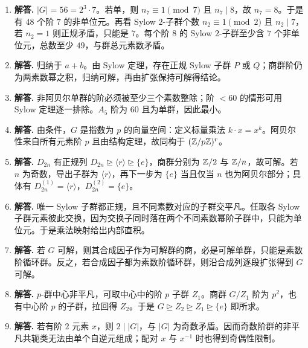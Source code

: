 \begin{enumerate}[label=\textbf{\arabic*.}, leftmargin=*, itemsep=1em]
\item \textbf{解答.} $|G|=56=2^3\cdot7$。若单，则 $n_7\equiv1\pmod7$ 且 $n_7\mid8$，故 $n_7=8$。于是有 $48$ 个阶 $7$ 的非单位元。再看 Sylow $2$-子群个数 $n_2\equiv1\pmod2$ 且 $n_2\mid7$，若 $n_2=1$ 则正规矛盾，只能是 $7$。每个阶 $8$ 的 Sylow $2$-子群至少含 $7$ 个非单位元，总数至少 $49$，与群总元素数矛盾。
\item \textbf{解答.} 归纳于 $a+b$。由 Sylow 定理，存在正规 Sylow 子群 $P$ 或 $Q$；商群阶仍为两素数幂之积，归纳可解，再由扩张保持可解得结论。
\item \textbf{解答.} 非阿贝尔单群的阶必须被至少三个素数整除；阶 $<60$ 的情形可用 Sylow 定理逐一排除。$A_5$ 阶为 $60$ 且为单群，因此最小。
\item \textbf{解答.} 由条件，$G$ 是指数为 $p$ 的向量空间：定义标量乘法 $k\cdot x=x^k$。阿贝尔性来自所有元素阶 $p$ 且由结构定理，故同构于 $(\mathbb{Z}/p\mathbb{Z})^r$。
\item \textbf{解答.} $D_{2n}$ 有正规列 $D_{2n}\trianglerighteq\langle r\rangle\trianglerighteq\{e\}$，商群分别为 $\mathbb{Z}/2$ 与 $\mathbb{Z}/n$，故可解。若 $n$ 为奇数，导出子群为 $\langle r\rangle$，再下一步为 $\{e\}$ 当且仅当 $n$ 也为阿贝尔部分；具体有 $D_{2n}^{(1)}=\langle r\rangle$，$D_{2n}^{(2)}=\{e\}$。
\item \textbf{解答.} 唯一 Sylow 子群都正规，且不同素数对应的子群交平凡。任取各 Sylow 子群元素彼此交换，因为交换子同时落在两个不同素数幂阶子群中，只能为单位元。于是乘法映射给出内部直积。
\item \textbf{解答.} 若 $G$ 可解，则其合成因子作为可解群的商，必是可解单群，只能是素数阶循环群。反之，若合成因子都为素数阶循环群，则沿合成列逐段扩张得到 $G$ 可解。
\item \textbf{解答.} $p$-群中心非平凡，可取中心中的阶 $p$ 子群 $Z_1$。商群 $G/Z_1$ 阶为 $p^2$，也有中心阶 $p$ 的子群，拉回得 $Z_2$。于是 $G\trianglerighteq Z_2\trianglerighteq Z_1\trianglerighteq\{e\}$ 即所求。
\item \textbf{解答.} 若有阶 $2$ 元素 $x$，则 $2\mid|G|$，与 $|G|$ 为奇数矛盾。因而奇数阶群的非平凡共轭类无法由单个自逆元组成；配对 $x$ 与 $x^{-1}$ 时也得到奇偶性限制。
\end{enumerate}
